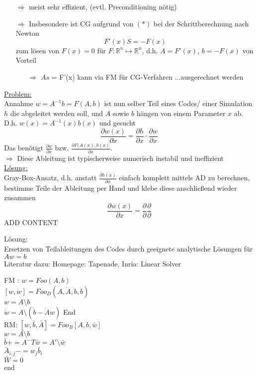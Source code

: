 \noindent
\begin{itemize}
	\item[$\Rightarrow$] meist sehr effizient, (evtl. Preconditioning nötig)
	\item[$\Rightarrow$] Insbesondere ist CG aufgrund von $(*)$ bei der Schrittberechnung nach Newton 
	$$F'(x)S = -F(x)$$
	zum lösen von $F(x)=0$ für $F:\mathbb{R}^n\mapsto\mathbb{R}^n$, d.h. $A=F'(x)$, $b=-F(x)$ von Vorteil
	\begin{itemize}
		\item[$\Rightarrow$] $As$ = F'(x) kann via FM für CG-Verfahren ...ausgerechnet werden
	\end{itemize} 
\end{itemize}
\noindent
\underline{Problem:}\\
Annahme $w = A^{-1}b = F(A,b)$ ist nun selber Teil eines Codes/ einer Simulation $h$ die abgeleitet werden soll, und $A$ sowie $b$ hängen von einem Parameter $x$ ab. D.h. $w(x)= A^{-1}(x)b(x)$ und gesucht
$$\frac{\partial w(x)}{\partial x} = \frac{\partial h}{\partial x}\cdot \frac{\partial w}{\partial x}$$
Das benötigt $\frac{\partial w}{\partial x}$ bzw. $\frac{\partial F(A(x),b(x)}{\partial x}$.\\
$\Rightarrow$ Diese Ableitung ist typischerweise numerisch instabil und ineffizient
\\

\noindent
\underline{Lösung:}\\
Gray-Box-Ansatz, d.h. anstatt $\frac{\partial h(x)}{\partial x}$ einfach komplett mittels AD zu berechnen, bestimme Teile der Ableitung per Hand und klebe diese anschließend wieder zusammen
$$\frac{\partial w(x)}{\partial x} = \frac{\partial}{\partial} \frac{\partial}{\partial}$$
ADD CONTENT

Lösung:\\
Ersetzen von Teilableitungen des Codes durch geeignete analytische Lösungen für $Aw = b$\\
Literatur dazu: Homepage: Tapenade, Inria: Linear Solver

FM : $w = Foo(A,b)$\\
$[w, \dot{w}]=Foo_D(A,\dot{A},b,\dot{b})$\\
$w = A\setminus b$\\
$\dot{w}=A\setminus (\dot{b}-\dot{A}w)$
End\\

RM: $[w, \bar{b},\bar{A}] = Foo_B[A,b,\bar{w}]$\\
$w= A\setminus b$\\
$\bar{b}+ =A^-T\bar{w}= A' \setminus \bar{w}$\\
$\bar{A}_{i,j}-= w_j\bar{b}_i$\\
$\bar{W}=0$\\
end
